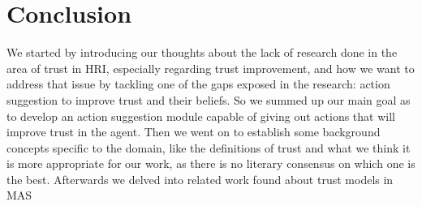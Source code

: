 \section{Conclusion}
\label{sec:Conclusion}
We started by introducing our thoughts about the lack of research done in the area of trust in \ac{HRI}, especially regarding trust improvement, and how we want to address that issue by tackling one of the gaps exposed in the research: action suggestion to improve trust and their beliefs. So we summed up our main goal as to develop an action suggestion module capable of giving out actions that will improve trust in the agent. Then we went on to establish some background concepts specific to the domain, like the definitions of trust and what we think it is more appropriate for our work, as there is no literary consensus on which one is the best. Afterwards we delved into related work found about trust models in \ac{MAS}
